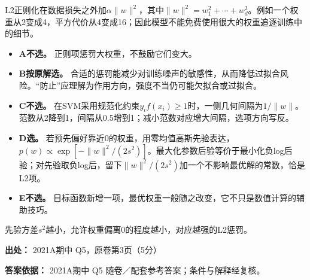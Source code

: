 L2正则化在数据损失之外加\(\alpha\|w\|^2\)，其中\(\|w\|^2=w_1^2+\cdots+w_d^2\)。例如一个权重从2变成4，平方代价从4变成16；因此模型不能免费使用很大的权重追逐训练中的细节。



\begin{itemize}

\item \textbf{A不选。} 正则项惩罚大权重，不鼓励它们变大。

\item \textbf{B按原解选。} 合适的惩罚能减少对训练噪声的敏感性，从而降低过拟合风险。“防止”应理解为作用方向，强度不当仍可能欠拟合或过拟合。

\item \textbf{C不选。} 在SVM采用规范化约束\(y_if(x_i)\ge1\)时，一侧几何间隔为\(1/\|w\|\)。范数从2降到1，间隔从0.5增到1；减小范数对应增大间隔，选项方向写反。

\item \textbf{D选。} 若预先偏好靠近0的权重，用零均值高斯先验表达，\(p(w)\propto\exp[-\|w\|^2/(2s^2)]\)。最大化参数后验等价于最小化负log后验；对先验取负log后，留下\(\|w\|^2/(2s^2)\)加一个不影响最优解的常数，恰是L2项。

\item \textbf{E不选。} 目标函数新增一项，最优权重一般随之改变，它不只是数值计算的辅助技巧。

\end{itemize}


先验方差\(s^2\)越小，允许权重偏离0的程度越小，对应越强的L2惩罚。


\textbf{出处：} 2021A期中 Q5，原卷第3页（5分）


\textbf{答案依据：} 2021A期中 Q5 随卷／配套参考答案；条件与解释经复核。
